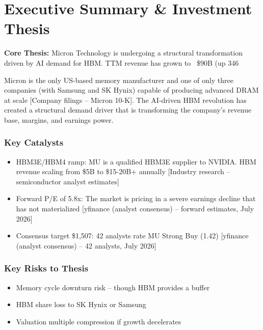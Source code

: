 \documentclass[11pt,a4paper]{report}
\newcommand{\highlightbox}[2][gslightblue]{%
  \begin{center}
    \colorbox{#1}{\begin{minipage}{0.92\textwidth}\vspace{8pt}#2\vspace{8pt}\end{minipage}}
  \end{center}
}
\begin{document}
\newpage
\tableofcontents
\newpage

\chapter{Executive Summary \& Investment Thesis}

\highlightbox{%
\textbf{Core Thesis:} Micron Technology is undergoing a structural transformation driven by AI demand for HBM. TTM revenue has grown to ~\$90B (up 346%
}

Micron is the only US-based memory manufacturer and one of only three companies (with Samsung and SK Hynix) capable of producing advanced DRAM at scale [Company filings -- Micron 10-K]. The AI-driven HBM revolution has created a structural demand driver that is transforming the company's revenue base, margins, and earnings power.

\subsection*{Key Catalysts}
\begin{itemize}[nosep]
  \item HBM3E/HBM4 ramp: MU is a qualified HBM3E supplier to NVIDIA. HBM revenue scaling from \$5B to \$15-20B+ annually [Industry research -- semiconductor analyst estimates]\item Forward P/E of 5.8x: The market is pricing in a severe earnings decline that has not materialized [yfinance (analyst consensus) -- forward estimates, July 2026]\item Consensus target \$1,507: 42 analysts rate MU Strong Buy (1.42) [yfinance (analyst consensus) -- 42 analysts, July 2026]
\end{itemize}

\subsection*{Key Risks to Thesis}
\begin{itemize}[nosep]
  \item Memory cycle downturn risk -- though HBM provides a buffer\item HBM share loss to SK Hynix or Samsung\item Valuation multiple compression if growth decelerates
\end{itemize}
\end{document}
